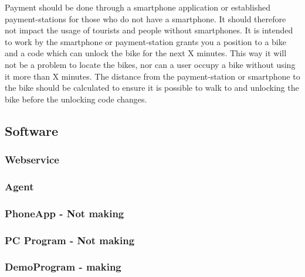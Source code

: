Payment should be done through a smartphone application or established payment-stations for those who do not have a smartphone. It should therefore not impact the usage of tourists and people without smartphones.
It is intended to work by the smartphone or payment-station grants you a position to a bike and a code which can unlock the bike for the next X minutes. This way it will not be a problem to locate the bikes, nor can a user occupy a bike without using it more than X minutes. The distance from the payment-station or smartphone to the bike should be calculated to ensure it is possible to walk to and unlocking the bike before the unlocking code changes.


\subsection{Software}
\subsubsection{Webservice}
\subsubsection{Agent}
\subsubsection{PhoneApp - Not making}
\subsubsection{PC Program - Not making}
\subsubsection{DemoProgram - making}